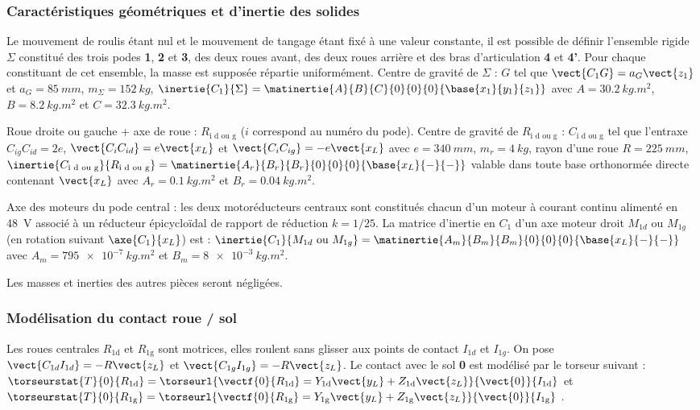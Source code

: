 \begin{multicols}{2}
\subsubsection*{Caractéristiques géométriques et d’inertie des solides}
Le mouvement de roulis étant nul et le mouvement de tangage étant fixé à une valeur constante, il est possible de
définir l’ensemble rigide $\Sigma$ constitué des trois podes \textbf{1}, \textbf{2} et \textbf{3}, des deux roues avant, des deux roues arrière et des
bras d’articulation \textbf{4} et \textbf{4’}. Pour chaque constituant de cet ensemble, la masse est supposée répartie
uniformément.
Centre de gravité de $\Sigma$ : $G$ tel que $\vect{C_1G}=a_G\vect{z_1}$ et $a_G=\SI{85}{mm}$, $m_{\Sigma}=\SI{152}{kg}$, $\inertie{C_1}{\Sigma}=\matinertie{A}{B}{C}{0}{0}{0}{\base{x_1}{y_1}{z_1}}$ 	avec $A=\SI{30,2}{kg.m^2}$, $B=\SI{8,2}{kg.m^2}$ et $C=\SI{32,3}{kg.m^2}$.


Roue droite ou gauche + axe de roue : $R_{\text{i d ou g}}$ ($i$ correspond au numéro du pode).
Centre de gravité de $R_{\text{i d ou g}}$ : $C_{\text{i d ou g}}$ tel que l'entraxe ${C_{ig}C_{id}}=2e$, $\vect{C_{i}C_{id}}=e\vect{x_L}$ et $\vect{C_{i}C_{ig}}=-e\vect{x_L}$
avec $e=\SI{340}{mm}$, $m_{r}=\SI{4}{kg}$, rayon d'une roue $R=\SI{225}{mm}$, $\inertie{C_{\text{i d ou g}}}{R_{\text{i d ou g}}}=\matinertie{A_r}{B_r}{B_r}{0}{0}{0}{\base{x_L}{-}{-}}$ valable dans toute base orthonormée directe contenant $\vect{x_L}$ avec $A_r=\SI{0,1}{kg.m^2}$ et $B_r=\SI{0,04}{kg.m^2}$.


Axe des moteurs du pode central : les deux motoréducteurs centraux sont constitués chacun d’un moteur à courant continu alimenté en \SI{48}{V} associé à un réducteur épicycloïdal de rapport de réduction $k = 1/ 25$. La matrice d’inertie en $C_1$ d’un axe moteur droit $M_{1d}$ ou $M_{1g}$ (en rotation suivant $\axe{C_1}{x_L}$) est :
$\inertie{C_{1}}{M_{1d}\text{ ou } M_{1g}}=\matinertie{A_m}{B_m}{B_m}{0}{0}{0}{\base{x_L}{-}{-}}$
avec $A_m=\SI{795e-7}{kg.m^2}$ et $B_m=\SI{8e-3}{kg.m^2}$.

Les masses et inerties des autres pièces seront négligées.

\subsubsection*{Modélisation du contact roue / sol}

Les roues centrales $R_{\text{1d}}$ et $R_{\text{1g}}$ sont motrices, elles roulent sans glisser aux points de contact $I_{1d}$ et $I_{1g}$. On pose $\vect{C_{1d}I_{1d}}=-R\vect{z_L}$ et $\vect{C_{1g}I_{1g}}=-R\vect{z_L}$. 
Le contact avec le sol \textbf{0} est modélisé par le torseur suivant : 
$\torseurstat{T}{0}{R_{\text{1d}}}=\torseurl{\vectf{0}{R_{\text{1d}}} =Y_{\text{1d}}\vect{y_L}+Z_{\text{1d}}\vect{z_L} }{\vect{0}}{I_{\text{1d}}}$ et
$\torseurstat{T}{0}{R_{\text{1g}}}=\torseurl{\vectf{0}{R_{\text{1g}}} =Y_{\text{1g}}\vect{y_L}+Z_{\text{1g}}\vect{z_L} }{\vect{0}}{I_{\text{1g}}}$ .



\end{multicols}
